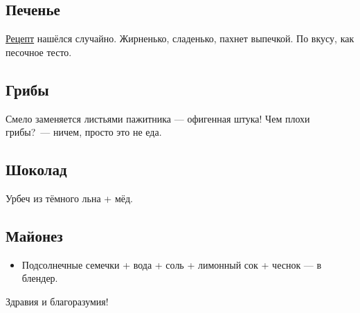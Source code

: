 \subsection{Печенье}

\hyperref[cookies]{Рецепт} нашёлся случайно. Жирненько, сладенько, пахнет выпечкой. По вкусу, как песочное тесто.

\subsection{Грибы}

Смело заменяется листьями пажитника — офигенная штука! Чем плохи грибы?~--- ничем, просто это не еда.

\subsection{Шоколад}

Урбеч из тёмного льна + мёд.

\subsection{Майонез}
\begin{itemize}
\item Подсолнечные семечки + вода + соль + лимонный сок + чеснок — в блендер.
\end{itemize}

Здравия и благоразумия!


